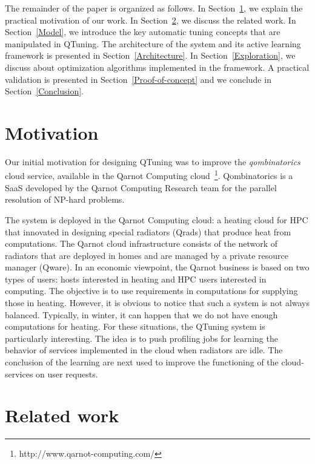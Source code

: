 \documentclass[10pt, conference, compsocconf]{IEEEtran}
\begin{document}
The remainder of the paper is organized as follows. In Section~\ref{Motivation}, we explain the practical motivation of 
our work. In Section~\ref{Related}, we discuss the related work. 
In Section~\ref{Model}, we introduce the key automatic tuning concepts that are manipulated in QTuning. 
The architecture of the system and its active learning framework is presented in Section~\ref{Architecture}. 
In Section~\ref{Exploration}, we discuss about optimization algorithms implemented in the framework. 
A practical validation is presented in Section~\ref{Proof-of-concept} and we conclude in 
Section~\ref{Conclusion}.


\section{Motivation} \label{Motivation}

Our initial motivation for designing QTuning was to improve the {\it qombinatorics} 
cloud service, available in the Qarnot Computing cloud~\footnote{http://www.qarnot-computing.com/}. Qombinatorics is a SaaS 
developed by the Qarnot Computing Research team for the parallel resolution of NP-hard problems.

The system is deployed in the Qarnot Computing cloud: a heating cloud for HPC that innovated in designing special radiators (Qrads) that produce heat from computations. The Qarnot cloud infrastructure consists of the network of radiators that are deployed in homes and are managed by a private resource manager (Qware). 
In an economic viewpoint, the Qarnot business is based on two types of users: hosts interested in heating and HPC users interested 
in computing. The objective is to use requirements in computations for supplying those in heating.
However, it is obvious to notice that such a system is not always balanced. Typically, in winter, it can happen that we 
do not have enough computations for heating. For these situations, the QTuning system is particularly interesting. 
The idea is to push profiling jobs for learning the behavior of services implemented in the cloud when radiators are idle. 
The conclusion of the learning are next used to improve the functioning of the cloud-services on user requests.




\section{Related work} \label{Related}
\end{document}
